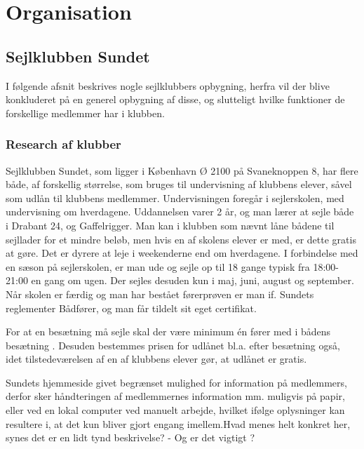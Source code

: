 \chapter{Organisation}\label{chap:organisation}

\cbstart

\section{Sejlklubben Sundet}

I følgende afsnit beskrives nogle sejlklubbers opbygning, herfra vil der blive konkluderet på en generel opbygning af
disse, og slutteligt hvilke funktioner de forskellige medlemmer har i klubben.

\subsection{Research af klubber}\label{subsec:research}


Sejlklubben Sundet, som ligger i København Ø 2100 på Svaneknoppen 8, har flere både, af forskellig størrelse, som bruges
til undervisning af klubbens elever, såvel som udlån til klubbens medlemmer. Undervisningen foregår i sejlerskolen, med
undervisning om hverdagene. Uddannelsen varer 2 år, og man lærer at sejle både i Drabant 24, og Gaffelrigger. Man kan i
klubben som nævnt låne bådene til sejllader for et mindre beløb, men hvis en af skolens elever er med, er dette gratis
at gøre. Det er dyrere at leje i weekenderne end om hverdagene. I forbindelse med en sæson på sejlerskolen, er man ude
og sejle op til 18 gange typisk fra 18:00-21:00 en gang om ugen. Der sejles desuden kun i maj, juni, august og
september. Når skolen er færdig og man har bestået førerprøven er man if. Sundets reglementer Bådfører, og man får
tildelt sit eget certifikat.

For at en besætning må sejle skal der være minimum én fører med i bådens besætning . Desuden bestemmes prisen for udlånet bl.a. efter besætning også, idet tilstedeværelsen af en af klubbens elever
gør, at udlånet er gratis.\citep{Sundet}

Sundets hjemmeside givet begrænset mulighed for information på medlemmers, derfor sker håndteringen af medlemmernes
information mm. muligvis på papir, eller ved en lokal computer ved manuelt arbejde, hvilket ifølge oplysninger
 kan resultere i, at det kun bliver gjort engang imellem.{Hvad menes
helt konkret her, synes det er en lidt tynd beskrivelse? - Og er det vigtigt ? }

